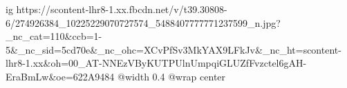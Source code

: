  
 
 
 
 

\ifcmt
  ig https://scontent-lhr8-1.xx.fbcdn.net/v/t39.30808-6/274926384_10225229070727574_5488407777771237599_n.jpg?_nc_cat=110&ccb=1-5&_nc_sid=5cd70e&_nc_ohc=XCvPfSv3MkYAX9LFkJv&_nc_ht=scontent-lhr8-1.xx&oh=00_AT-NNEzVByKUTPUlnUmpqiGLUZfFvzctel6gAH-EraBmLw&oe=622A9484
  @width 0.4
	@wrap center
\fi
